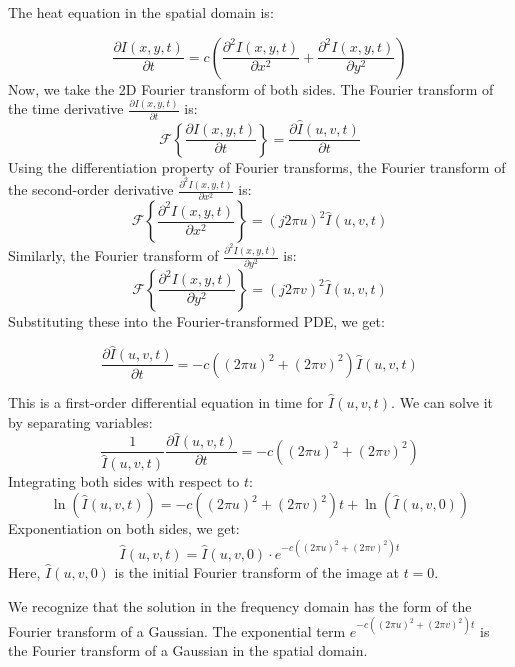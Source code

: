 \documentclass{article}
\begin{document}
The heat equation in the spatial domain is:

\[
\frac{\partial I(x, y, t)}{\partial t} = c \left( \frac{\partial^2 I(x, y, t)}{\partial x^2} + \frac{\partial^2 I(x, y, t)}{\partial y^2} \right)
\]
Now, we take the 2D Fourier transform of both sides.
The Fourier transform of the time derivative \( \frac{\partial I(x, y, t)}{\partial t} \) is:
  \[
  \mathcal{F}\left\{\frac{\partial I(x, y, t)}{\partial t}\right\} = \frac{\partial \hat{I}(u, v, t)}{\partial t}
  \]
Using the differentiation property of Fourier transforms, the Fourier transform of the second-order derivative \( \frac{\partial^2 I(x, y, t)}{\partial x^2} \) is:
  \[
  \mathcal{F}\left\{ \frac{\partial^2 I(x, y, t)}{\partial x^2} \right\} = (j 2 \pi u)^2 \hat{I}(u, v, t)
  \]
Similarly, the Fourier transform of \( \frac{\partial^2 I(x, y, t)}{\partial y^2} \) is:
  \[
  \mathcal{F}\left\{ \frac{\partial^2 I(x, y, t)}{\partial y^2} \right\} = (j 2 \pi v)^2 \hat{I}(u, v, t)
  \]
Substituting these into the Fourier-transformed PDE, we get:

\[
\frac{\partial \hat{I}(u, v, t)}{\partial t} = -c \left( (2 \pi u)^2 + (2 \pi v)^2 \right) \hat{I}(u, v, t)
\]


This is a first-order differential equation in time for \( \hat{I}(u, v, t) \). We can solve it by separating variables:
\[
\frac{1}{\hat{I}(u, v, t)} \frac{\partial \hat{I}(u, v, t)}{\partial t} = -c \left( (2 \pi u)^2 + (2 \pi v)^2 \right)
\]
Integrating both sides with respect to \( t \):
\[
\ln(\hat{I}(u, v, t)) = -c \left( (2 \pi u)^2 + (2 \pi v)^2 \right) t + \ln(\hat{I}(u, v, 0))
\]
Exponentiation on both sides, we get:
\[
\hat{I}(u, v, t) = \hat{I}(u, v, 0) \cdot e^{-c \left( (2 \pi u)^2 + (2 \pi v)^2 \right) t}
\]
Here, \( \hat{I}(u, v, 0) \) is the initial Fourier transform of the image at \( t = 0 \).


We recognize that the solution in the frequency domain has the form of the Fourier transform of a Gaussian. The exponential term \( e^{-c \left( (2 \pi u)^2 + (2 \pi v)^2 \right) t} \) is the Fourier transform of a Gaussian in the spatial domain.
\vspace{5pt}
\end{document}
